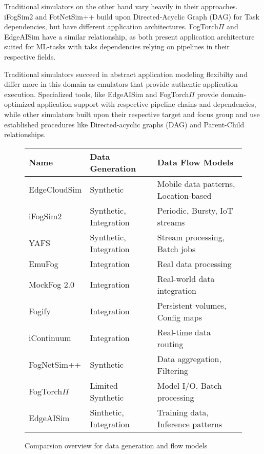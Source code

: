 Traditional simulators on the other hand vary heavily in their approaches.
iFogSim2 and FotNetSim++ build upon Directed-Acyclic Graph (DAG) for Task dependencies, but have different application architectures.
FogTorch$\Pi$ and EdgeAISim have a similar relationship, as both present application architecture suited for ML-tasks with taks dependencies relying on pipelines in their respective fields.

Traditional simulators succeed in abstract application modeling flexibilty and differ more in this domain as emulators that provide authentic application execution.
Specialized tools, like EdgeAISim and FogTorch$\Pi$ provde domain-optimized application support with respective pipeline chains and dependencies, while other simulators built upon their respective target and focus group and use established procedures like Directed-acyclic graphs (DAG) and Parent-Child relationships.

\begin{figure}[H]
  \centering
  \begin{tabularx}{\textwidth}{ l | X | X }
    \hline
    \textbf{Name} & \textbf{Data Generation} & \textbf{Data Flow Models}\\
    \hline\hline
    EdgeCloudSim  & Synthetic               & Mobile data patterns, Location-based \\\hline
    iFogSim2      & Synthetic, Integration  & Periodic, Bursty, IoT streams \\\hline
    YAFS          & Synthetic, Integration  & Stream processing, Batch jobs \\\hline
    EmuFog        & Integration             & Real data processing \\\hline
    MockFog 2.0   & Integration             & Real-world data integration \\\hline
    Fogify        & Integration             & Persistent volumes, Config maps \\\hline
    iContinuum    & Integration             & Real-time data routing \\\hline
    FogNetSim++   & Synthetic               & Data aggregation, Filtering \\\hline
    FogTorch$\Pi$ & Limited Synthetic       & Model I/O, Batch processing \\\hline
    EdgeAISim     & Sinthetic, Integration  & Training data, Inference patterns \\\hline
  \end{tabularx}
  \caption{Comparsion overview for data generation and flow models}
  \label{tab:analysis-data-gen-n-flow}
\end{figure}

